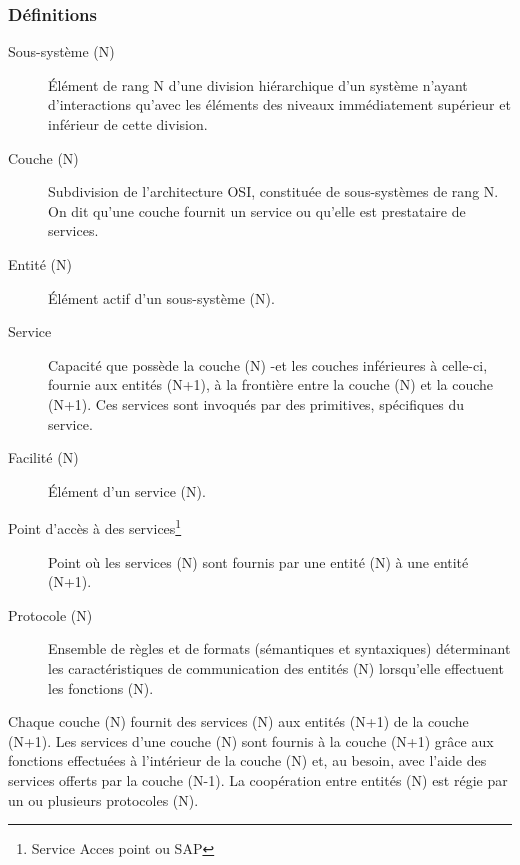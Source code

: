 \subsubsection{Définitions}
\begin{description}
	\item[Sous-système (N)]\'Elément de rang N d'une division hiérarchique d'un système n'ayant d'interactions qu'avec les éléments des niveaux immédiatement supérieur et inférieur de cette division.
	\item[Couche (N)] Subdivision de l'architecture OSI, constituée de sous-systèmes de rang N. On dit qu'une couche fournit un service ou qu'elle est prestataire de services.
	\item[Entité (N)] Élément actif d'un sous-système (N).
	\item[Service] Capacité que possède la couche (N) -et les couches inférieures à celle-ci, fournie aux entités (N+1), à la frontière entre la couche (N) et la couche (N+1). Ces services sont invoqués par des primitives, spécifiques du service.
	\item[Facilité (N)]Élément d'un service (N).
	\item[Point d'accès à des services\footnote{Service Acces point ou SAP}] Point où les services (N) sont fournis par une entité (N) à une entité (N+1).
	\item[Protocole (N)] Ensemble de règles et de formats (sémantiques et syntaxiques) déterminant les caractéristiques de communication des entités (N) lorsqu'elle effectuent les fonctions (N).
\end{description}

Chaque couche (N) fournit des services (N) aux entités (N+1) de la couche (N+1). Les services d'une couche (N) sont fournis à la couche (N+1) grâce aux fonctions effectuées à l'intérieur de la couche (N) et, au besoin, avec l'aide des services offerts par la couche (N-1).
La coopération entre entités (N) est régie par un ou plusieurs protocoles (N).

